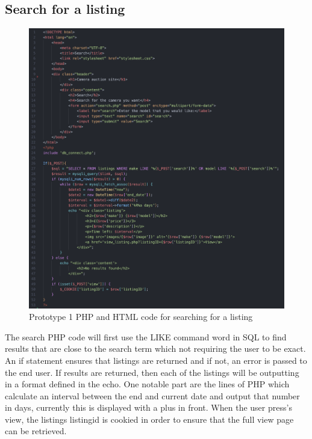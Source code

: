 \subsection{Search for a listing}
 \begin{figure}[H]
     \centering
     \includegraphics[scale=0.5]{ch3_developing/proto1/pro1_search.png}
     \caption{Prototype 1 PHP and HTML code for searching for a listing}
     \label{fig:pro1_search}
 \end{figure}
The search PHP code will first use the LIKE command word in SQL to find results that are close to the search term which not requiring the user to be exact. An if statement ensures that listings are returned and if not, an error is passed to the end user. If results are returned, then each of the listings will be outputting in a format defined in the echo. One notable part are the lines of PHP which calculate an interval between the end and current date and output that number in days, currently this is displayed with a plus in front. When the user press’s view, the listings listingid is cookied in order to ensure that the full view page can be retrieved. 

